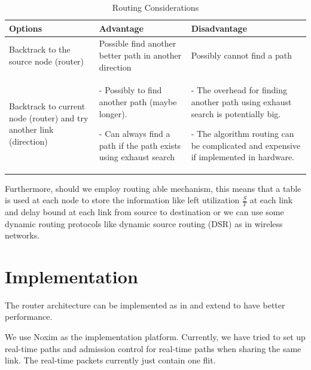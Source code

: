 \documentclass[10pt]{article}
\begin{document}
\begin{table}[h]
\begin{center}
  \begin{tabular}{ | p{3cm} | p{4cm} | p{4cm} |}
    \hline
	Options & Advantage & Disadvantage \\ \hline
	Backtrack to the source node (router) & 
	Possible find another better path in another direction &
	Possibly cannot find a path \\ \hline
	Backtrack to current node (router) and try another link (direction) &
	- Possibly to find another path (maybe longer).  

	- Can always find a path if the path exists using exhaust search	&
	- The overhead for finding another path using exhaust search is potentially  big.

	- The algorithm routing can be complicated and expensive if implemented in hardware. \\
    \hline
  \end{tabular}
\end{center}
\caption{Routing Considerations}
\label{table:RoutingConsiderations}
\end{table}

Furthermore, should we employ routing able mechanism, this means that a table 
is used at each node to store the information like left utilization $\frac{S}{T}$ at 
each link and delay bound at each link from source to destination or we can 
use some dynamic routing protocols like dynamic source routing (DSR) as in wireless networks.

\section{Implementation}
The router architecture can be implemented as in \cite{Rexford98arouter, Zhang_1service} 
and extend \cite{PehDelayModel, PehSpecPipeR} to have better performance.

We use Noxim \cite{Noxim} as the implementation platform. Currently, we have tried
to set up real-time paths and admission control for real-time paths when sharing 
the same link. The real-time packets currently just contain one flit.



\end{document}
